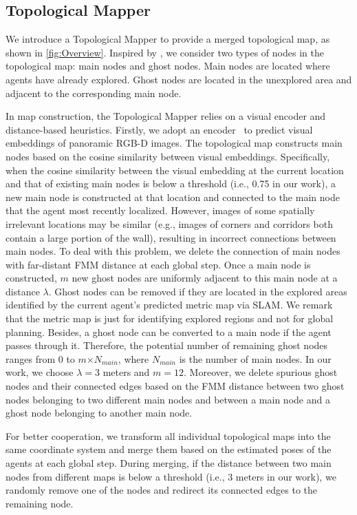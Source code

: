 \subsection{Topological Mapper\label{sec:mapper}}
We introduce a Topological Mapper to provide a merged topological map, as shown in \cref{fig:Overview}. Inspired by \cite{topo-map2,norl}, we consider two types of nodes in the topological map: main nodes and ghost nodes. 
Main nodes are located where agents have already explored. Ghost nodes are located in the unexplored area and adjacent to the corresponding main node. 

In map construction, the Topological Mapper relies on a visual encoder and distance-based heuristics. Firstly, we adopt an encoder~\cite{vgm} to predict visual embeddings of panoramic RGB-D images. The topological map constructs main nodes based on the cosine similarity between visual embeddings. Specifically, when the cosine similarity between the visual embedding at the current location and that of existing main nodes is below a threshold (i.e., 0.75 in our work), a new main node is constructed at that location and connected to the main node that the agent most recently localized. However, images of some spatially irrelevant locations may be similar (e.g., images of corners and corridors both contain a large portion of the wall), resulting in incorrect connections between main nodes. To deal with this problem, we delete the connection of main nodes with far-distant FMM distance at each global step. 
Once a main node is constructed, $m$ new ghost nodes are uniformly adjacent to this main node at a distance $\lambda$. Ghost nodes can be removed if they are located in the explored areas identified by the current agent's predicted metric map via SLAM. We remark that the metric map is just for identifying explored regions and not for global planning. Besides, a ghost node can be converted to a main node if the agent passes through it. Therefore, the potential number of remaining ghost nodes ranges from 0 to $m$$\times$$N_{main}$, where $N_{main}$ is the number of main nodes. In our work, we choose $\lambda=3$ meters and $m=12$. Moreover, we delete spurious ghost nodes and their connected edges based on the FMM distance between two ghost nodes belonging to two different main nodes and between a main node and a ghost node belonging to another main node.

For better cooperation, we transform all individual topological maps into the same coordinate system and merge them based on the estimated poses of the agents at each global step. During merging, if the distance between two main nodes from different maps is below a threshold (i.e., 3 meters in our work), we randomly remove one of the nodes and redirect its connected edges to the remaining node.




